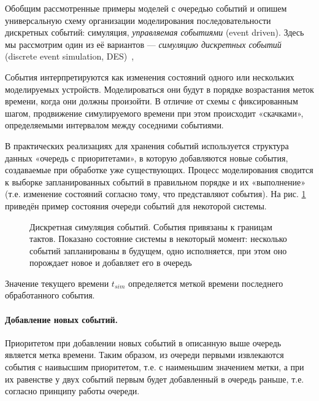 Обобщим рассмотренные примеры моделей с очередью событий и опишем универсальную схему организации моделирования последовательности дискретных событий: симуляция, \textit{управляемая событиями} (\abbr event driven). Здесь мы рассмотрим один из её вариантов — \textit{симуляцию дискретных событий} (\abbr discrete event simulation, DES)~\cite{fujimoto-parallel-dist-sim, introduction-to-des, Cain02preciseand},

События интерпретируются как изменения состояний одного или нескольких моделируемых устройств. Моделироваться они будут в порядке возрастания меток времени, когда они должны произойти. В отличие от схемы с фиксированным шагом, продвижение симулируемого времени при этом происходит «скачками», определяемыми интервалом между соседними событиями. 

В практических реализациях для хранения событий используется структура данных «очередь с приоритетами», в которую добавляются новые события, создаваемые при обработке уже существующих. Процесс моделирования сводится к выборке запланированных событий в правильном порядке и их «выполнение» (т.е. изменение состояний согласно тому, что представляют события). На рис. \ref{fig:queue1} приведён пример состояния очереди событий для некоторой системы.

\begin{figure}[htp]
    \centering
    \caption[Дискретная симуляция событий]{Дискретная симуляция событий. События привязаны к границам тактов. Показано состояние системы в некоторый момент: несколько событий запланированы в будущем, одно исполняется, при этом оно порождает новое и добавляет его в очередь}
    \label{fig:queue1}
\end{figure}

Значение текущего времени $t_{sim}$ определяется меткой времени последнего обработанного события.

\paragraph{Добавление новых событий.} Приоритетом при добавлении новых событий в описанную выше очередь является метка времени. Таким образом, из очереди первыми извлекаются события с наивысшим приоритетом, т.е. с наименьшим значением метки, а при их равенстве у двух событий первым будет добавленный в очередь раньше, т.е. согласно принципу работы очереди.

%

